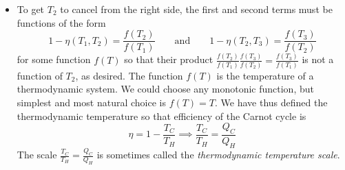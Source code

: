 \documentclass[11pt, a4paper]{article}
\begin{document}
\begin{itemize}
	\item To get $ T_{2} $ to cancel from the right side, the first and second terms must be functions of the form 
	\begin{equation*}
		1 - \eta(T_{1}, T_{2}) = \frac{f(T_{2})}{f(T_{1})} \qquad \text{and} \qquad 1 - \eta(T_{2}, T_{3}) = \frac{f(T_{3})}{f(T_{2})} 
	\end{equation*}
	for some function $ f(T) $ so that their product $ \frac{f(T_{2})}{f(T_{1})}  \frac{f(T_{3})}{f(T_{2})} = \frac{f(T_{3})}{f(T_{1})}$ is not a function of $ T_{2} $, as desired. The function $ f(T) $ is the temperature of a thermodynamic system. We could choose any monotonic function, but simplest and most natural choice is $ f(T) = T $. We have thus defined the thermodynamic temperature so that efficiency of the Carnot cycle is 
	\begin{equation*}
		\eta = 1 - \frac{T_{C}}{T_{H}} \implies  \frac{T_{C}}{T_{H}} = \frac{Q_{C}}{Q_{H}}
	\end{equation*}
	The scale $ \frac{T_{C}}{T_{H}} = \frac{Q_{C}}{Q_{H}} $ is sometimes called the \textit{thermodynamic temperature scale}.
\end{itemize}
\end{document}
